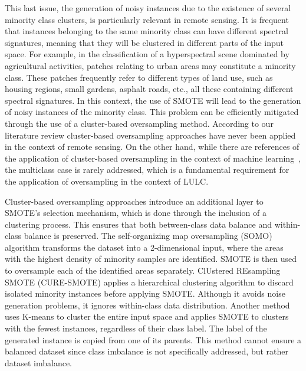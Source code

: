 \documentclass[preprint,12pt]{elsarticle}
\begin{document}
This last issue, the generation of noisy instances due to the existence of
several minority class clusters, is particularly relevant in remote sensing.
It is frequent that instances belonging to the same minority class can have
different spectral signatures, meaning that they will be clustered in
different parts of the input space. For example, in the classification of a
hyperspectral scene dominated by agricultural activities, patches relating to
urban areas may constitute a minority class. These patches frequently refer to
different types of land use, such as housing regions, small gardens, asphalt
roads, etc., all these containing different spectral signatures. In this
context, the use of SMOTE will lead to the generation of noisy instances of
the minority class. This problem can be efficiently mitigated through the use
of a cluster-based oversampling method. According to our literature review
cluster-based oversampling approaches have never been applied in the context
of remote sensing. On the other hand, while there are references of the
application of cluster-based oversampling in the context of machine
learning~\cite{Santos2015, Douzas2017, Ma2017, Douzas2018}, the multiclass
case is rarely addressed, which is a fundamental requirement for the
application of oversampling in the context of LULC. 

Cluster-based oversampling approaches introduce an additional layer to SMOTE's
selection mechanism, which is done through the inclusion of a clustering
process. This ensures that both between-class data balance and
within-class balance is preserved. The
self-organizing map oversampling (SOMO) \cite{Douzas2017} algorithm transforms
the dataset into a 2-dimensional input, where the areas with the highest
density of minority samples are identified. SMOTE is then used to oversample
each of the identified areas separately. ClUstered REsampling SMOTE
(CURE-SMOTE) \cite{Ma2017} applies a hierarchical clustering
algorithm to discard isolated minority instances before applying SMOTE.
Although it avoids noise generation problems, it ignores within-class data
distribution. Another method \cite{Santos2015} uses K-means to cluster the
entire input space and applies SMOTE to clusters with the fewest
instances, regardless of their class label. The label of the
generated instance is copied from one of its parents.
This method cannot ensure a balanced dataset since class imbalance is not
specifically addressed, but rather dataset imbalance.
\end{document}
